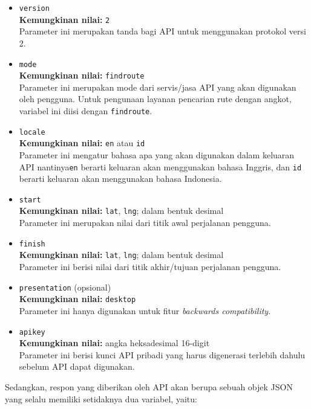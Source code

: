 \documentclass[a4paper,twoside]{article}
\begin{document}
\begin{enumerate}
\begin{itemize}
	\item \verb|version|\\
	\textbf{Kemungkinan nilai:} \verb|2|\\
	Parameter ini merupakan tanda bagi API untuk menggunakan protokol versi 2.
	\item \verb|mode|\\
	\textbf{Kemungkinan nilai:} \verb|findroute|\\
	Parameter ini merupakan mode dari servis/jasa API yang akan digunakan oleh pengguna. Untuk pengunaan layanan pencarian rute dengan angkot, variabel ini diisi dengan \verb|findroute|.
	\item \verb|locale|\\
	\textbf{Kemungkinan nilai:} \verb|en| atau \verb|id|\\
	Parameter ini mengatur bahasa apa yang akan digunakan dalam keluaran API nantinya\textemdash\verb|en| berarti keluaran akan menggunakan bahasa Inggris, dan \verb|id| berarti keluaran akan menggunakan bahasa Indonesia.
	\item \verb|start|\\
	\textbf{Kemungkinan nilai:} \verb|lat|, \verb|lng|; dalam bentuk desimal\\
	Parameter ini merupakan nilai \latlon dari titik awal perjalanan pengguna.
	\item \verb|finish|\\
	\textbf{Kemungkinan nilai:} \verb|lat|, \verb|lng|; dalam bentuk desimal\\
	Parameter ini berisi nilai \latlon dari titik akhir/tujuan perjalanan pengguna.
	\item \verb|presentation| (opsional)\\
	\textbf{Kemungkinan nilai:} \verb|desktop|\\
	Parameter ini hanya digunakan untuk fitur \textit{backwards compatibility}.
	\item \verb|apikey|\\
	\textbf{Kemungkinan nilai:} angka heksadesimal 16-digit\\
	Parameter ini berisi kunci API pribadi yang harus digenerasi terlebih dahulu sebelum API dapat digunakan.
\end{itemize}
\vspace{\baselineskip}
Sedangkan, respon yang diberikan oleh API akan berupa sebuah objek JSON yang selalu memiliki setidaknya dua variabel, yaitu:


\end{enumerate}
\end{document}
